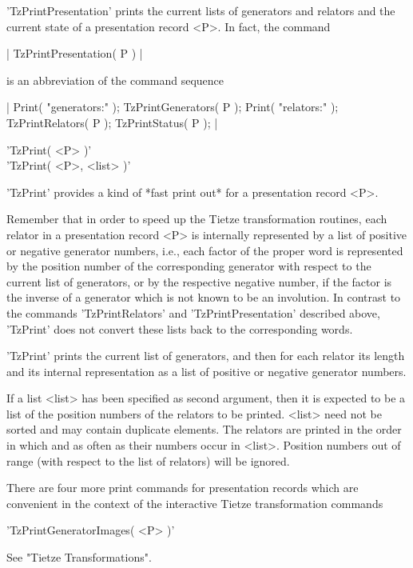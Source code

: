 'TzPrintPresentation' prints the current lists of generators and relators
and the current state of a presentation record <P>.  In fact, the command

|    TzPrintPresentation( P ) |

is an abbreviation of the command sequence

|    Print( "generators:\n" ); TzPrintGenerators( P );
    Print( "relators:\n" ); TzPrintRelators( P );
    TzPrintStatus( P ); |

\vspace{5mm}
'TzPrint( <P> )'%
 \\
'TzPrint( <P>, <list> )'

'TzPrint' provides a  kind of  *fast print out* for a presentation record
<P>.

Remember that  in order to  speed up  the Tietze transformation routines,
each relator in a presentation record  <P> is internally represented by a
list of positive or negative generator  numbers, i.e., each factor of the
proper  {\GAP}  word  is  represented  by  the  position  number  of  the
corresponding  generator with respect to the current list of  generators,
or by the respective negative  number, if  the factor is the inverse of a
generator which  is not known to be an involution.   In  contrast  to the
commands  'TzPrintRelators'  and  'TzPrintPresentation'  described above,
'TzPrint' does not  convert these lists back to the corresponding  {\GAP}
words.

'TzPrint' prints the  current  list  of  generators,  and  then  for each
relator its length and its internal representation as a list  of positive
or negative generator numbers.

If  a  list  <list> has been specified  as  second  argument, then it  is
expected to  be a list of  the position  numbers of the  relators  to  be
printed.  <list> need not be sorted  and may contain  duplicate elements.
The relators are printed  in the order  in which and  as  often  as their
numbers occur in <list>.  Position numbers out  of range (with respect to
the list of relators) will be ignored.

There are  four more  print commands for  presentation records  which are
convenient  in  the  context  of  the interactive  Tietze  transformation
commands\:

\vspace{5mm}
'TzPrintGeneratorImages( <P> )'

See "Tietze Transformations".

